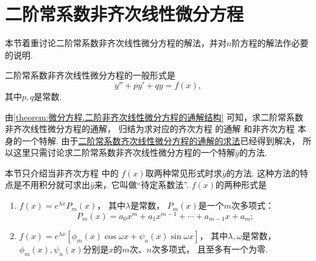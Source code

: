 \section{二阶常系数非齐次线性微分方程}\label{section:微分方程.常系数非齐次线性微分方程}
本节着重讨论二阶常系数非齐次线性微分方程的解法，并对\(n\)阶方程的解法作必要的说明.

二阶常系数非齐次线性微分方程的一般形式是
\begin{equation}\label{equation:微分方程.二阶常系数非齐次线性微分方程的一般形式}
y'' + p y' + q y = f(x),
\end{equation}
其中\(p,q\)是常数.

由\cref{theorem:微分方程.二阶非齐次线性微分方程的通解结构} 可知，求二阶常系数非齐次线性微分方程的通解，
归结为求对应的齐次方程  的通解
和非齐次方程  本身的一个特解.
由于\hyperref[section:微分方程.常系数齐次线性微分方程]{二阶常系数齐次线性微分方程的通解的求法}已经得到解决，
所以这里只需讨论求二阶常系数非齐次线性微分方程的一个特解\(\hat{y}\)的方法.

本节只介绍当非齐次方程  中的
\(f(x)\)取两种常见形式时求\(\hat{y}\)的方法.
这种方法的特点是不用积分就可求出\(\hat{y}\)来，它叫做“待定系数法”.
\(f(x)\)的两种形式是\begin{enumerate}
	\item \(f(x) = e^{\lambda x} P_m(x)\)，
	其中\(\lambda\)是常数，
	\(P_m(x)\)是一个\(m\)次多项式：\[
		P_m(x) = a_0 x^m + a_1 x^{m-1} + \dotsb + a_{m-1} x + a_m;
	\]

	\item \(f(x) = e^{\lambda x} [ \phi_m(x) \cos\omega x + \psi_n(x) \sin \omega x ]\)，
	其中\(\lambda,\omega\)是常数，
	\(\phi_m(x),\psi_n(x)\)分别是\(x\)的\(m\)次、\(n\)次多项式，
	且至多有一个为零.
\end{enumerate}

